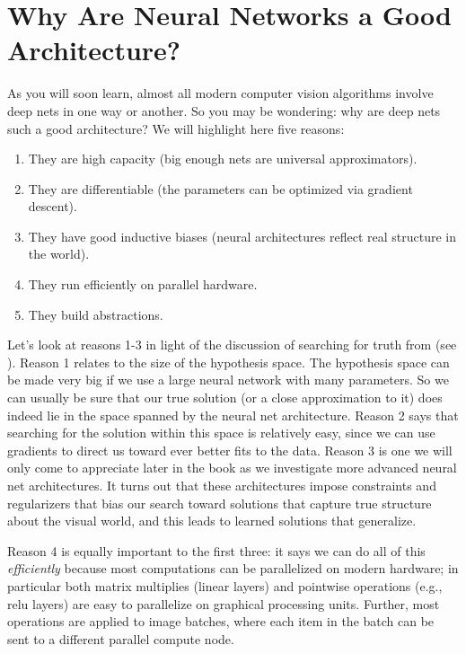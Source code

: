 \section{Why Are Neural Networks a Good Architecture?}
As you will soon learn, almost all modern computer vision algorithms involve deep nets in one way or another. So you may be wondering: why are deep nets such a good architecture? We will highlight here five reasons:
\begin{enumerate}
    \item They are high capacity (big enough nets are universal approximators).
    \item They are differentiable (the parameters can be optimized via gradient descent).
    \item They have good inductive biases (neural architectures reflect real structure in the world).
    \item They run efficiently on parallel hardware.
    \item They build abstractions.
\end{enumerate}
Let's look at reasons 1-3 in light of the discussion of searching for truth from \chap{\ref{chapter:problem_of_generalization}} (see \fig{\ref{fig:problem_of_generalization:search_space_tools}}). Reason 1 relates to the size of the hypothesis space. The hypothesis space can be made very big if we use a large neural network with many parameters. So we can usually be sure that our true solution (or a close approximation to it) does indeed lie in the space spanned by the neural net architecture. Reason 2 says that searching for the solution within this space is relatively easy, since we can use gradients to direct us toward ever better fits to the data. Reason 3 is one we will only come to appreciate later in the book as we investigate more advanced neural net architectures. It turns out that these architectures impose constraints and regularizers that bias our search toward solutions that capture true structure about the visual world, and this leads to learned solutions that generalize.

Reason 4 is equally important to the first three: it says we can do all of this \textit{efficiently} because most computations can be parallelized on modern hardware; in particular both matrix multiplies (linear layers) and pointwise operations (e.g., relu layers) are easy to parallelize on graphical processing units. Further, most operations are applied to image batches, where each item in the batch can be sent to a different parallel compute node.


